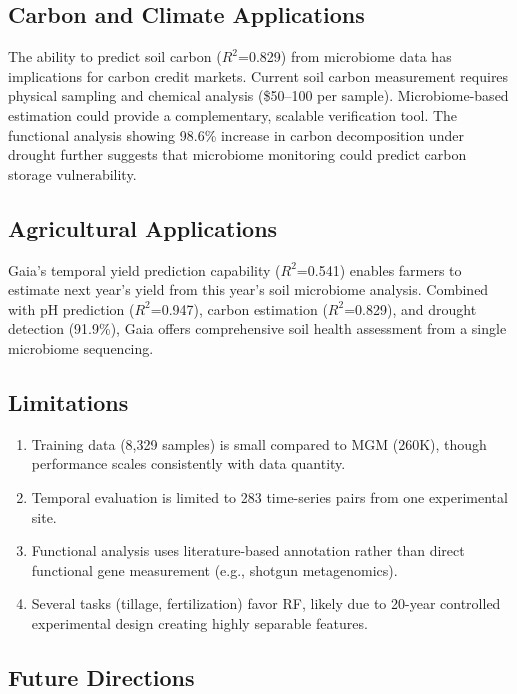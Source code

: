 \documentclass[11pt,a4paper]{article}
\begin{document}
\subsection{Carbon and Climate Applications}

The ability to predict soil carbon ($R^2$=0.829) from microbiome data has implications for carbon credit markets. Current soil carbon measurement requires physical sampling and chemical analysis (\$50--100 per sample). Microbiome-based estimation could provide a complementary, scalable verification tool. The functional analysis showing 98.6\% increase in carbon decomposition under drought further suggests that microbiome monitoring could predict carbon storage vulnerability.

\subsection{Agricultural Applications}

Gaia's temporal yield prediction capability ($R^2$=0.541) enables farmers to estimate next year's yield from this year's soil microbiome analysis. Combined with pH prediction ($R^2$=0.947), carbon estimation ($R^2$=0.829), and drought detection (91.9\%), Gaia offers comprehensive soil health assessment from a single microbiome sequencing.

\subsection{Limitations}

\begin{enumerate}
\item Training data (8,329 samples) is small compared to MGM (260K), though performance scales consistently with data quantity.
\item Temporal evaluation is limited to 283 time-series pairs from one experimental site.
\item Functional analysis uses literature-based annotation rather than direct functional gene measurement (e.g., shotgun metagenomics).
\item Several tasks (tillage, fertilization) favor RF, likely due to 20-year controlled experimental design creating highly separable features.
\end{enumerate}

\subsection{Future Directions}
\end{document}
